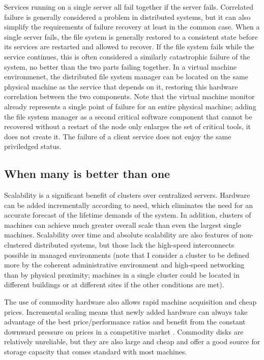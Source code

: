 Services running on a single server all fail together if the server fails. Correlated failure is generally considered a problem in distributed systems, but it can also simplify the requirements of failure recovery at least in the common case. When a single server fails, the file system is generally restored to a consistent state before its services are restarted and allowed to recover. If the file system fails while the service continues, this is often considered a similarly catastrophic failure of the system, no better than the two parts failing together. In a virtual machine environmenet, the distributed file system manager can be located on the same physical machine as the service that depends on it, restoring this hardware correlation between the two components. Note that the virtual machine monitor already represents a single point of failure for an entire physical machine; adding the file system manager as a second critical software component that cannot be recovered without a restart of the node only enlarges the set of critical tools, it does not create it. The failure of a client service does not enjoy the same priviledged status.

\subsection{When many is better than one}

Scalability is a significant benefit of clusters over centralized servers. Hardware can be added incrementally according to need, which eliminates the need for an accurate forecast of the lifetime demands of the system. In addition, clusters of machines can achieve much greater overall scale than even the largest single machines. Scalability over time and absolute scalability are also features of non-clustered distributed systems, but those lack the high-speed interconnects possible in managed environments (note that I consider a cluster to be defined more by the coherent administrative environment and high-speed networking than by physical proximity; machines in a single cluster could be located in different buildings or at different sites if the other conditions are met).

The use of commodity hardware also allows rapid machine acquisition and cheap prices. Incremental scaling means that newly added hardware can always take advantage of the best price/performance ratios and benefit from the constant downward pressure on prices in a competitive market \cite{fox}. Commodity disks are relatively unreliable, but they are also large and cheap and offer a good source for storage capacity \cite{patterson,warfield} that comes standard with most machines.

